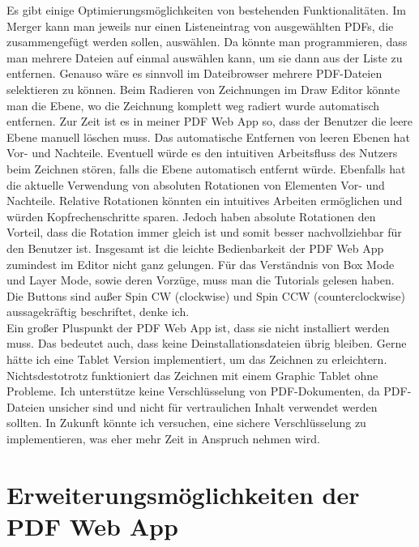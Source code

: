 Es gibt einige Optimierungsmöglichkeiten von bestehenden Funktionalitäten. Im Merger kann man jeweils nur einen Listeneintrag von ausgewählten PDFs, die zusammengefügt werden sollen, auswählen. Da könnte man programmieren, dass man mehrere Dateien auf einmal auswählen kann, um sie dann aus der Liste zu entfernen. Genauso wäre es sinnvoll im Dateibrowser mehrere PDF-Dateien selektieren zu können. Beim Radieren von Zeichnungen im Draw Editor könnte man die Ebene, wo die Zeichnung komplett weg radiert wurde automatisch entfernen. Zur Zeit ist es in meiner PDF Web App so, dass der Benutzer die leere Ebene manuell löschen muss. Das automatische Entfernen von leeren Ebenen hat Vor- und Nachteile. Eventuell würde es den intuitiven Arbeitsfluss des Nutzers beim Zeichnen stören, falls die Ebene automatisch entfernt würde. Ebenfalls hat die aktuelle Verwendung von absoluten Rotationen von Elementen Vor- und Nachteile. Relative Rotationen könnten ein intuitives Arbeiten ermöglichen und würden Kopfrechenschritte sparen. Jedoch haben absolute Rotationen den Vorteil, dass die Rotation immer gleich ist und somit besser nachvollziehbar für den Benutzer ist. Insgesamt ist die leichte Bedienbarkeit der PDF Web App zumindest im Editor nicht ganz gelungen. Für das Verständnis von Box Mode und Layer Mode, sowie deren Vorzüge, muss man die Tutorials gelesen haben. Die Buttons sind außer Spin CW (clockwise) und Spin CCW (counterclockwise) aussagekräftig beschriftet, denke ich. \\
Ein großer Pluspunkt der PDF Web App ist, dass sie nicht installiert werden muss. Das bedeutet auch, dass keine Deinstallationsdateien übrig bleiben. Gerne hätte ich eine Tablet Version implementiert, um das Zeichnen zu erleichtern. Nichtsdestotrotz funktioniert das Zeichnen mit einem Graphic Tablet ohne Probleme. Ich unterstütze keine Verschlüsselung von PDF-Dokumenten, da PDF-Dateien unsicher sind und nicht für vertraulichen Inhalt verwendet werden sollten. In Zukunft könnte ich versuchen, eine sichere Verschlüsselung zu implementieren, was eher mehr Zeit in Anspruch nehmen wird.

\section{Erweiterungsmöglichkeiten der PDF Web App}



